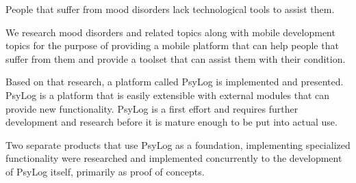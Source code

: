 People that suffer from mood disorders lack technological tools to assist them.

We research mood disorders and related topics along with mobile development topics for the purpose of providing a mobile platform that can help people that suffer from them and provide a toolset that can assist them with their condition.

Based on that research, a platform called PsyLog is implemented and presented.
PsyLog is a platform that is easily extensible with external modules that can provide new functionality.
PsyLog is a first effort and requires further development and research before it is mature enough to be put into actual use.

Two separate products that use PsyLog as a foundation, implementing specialized functionality were researched and implemented concurrently to the development of PsyLog itself, primarily as proof of concepts. 